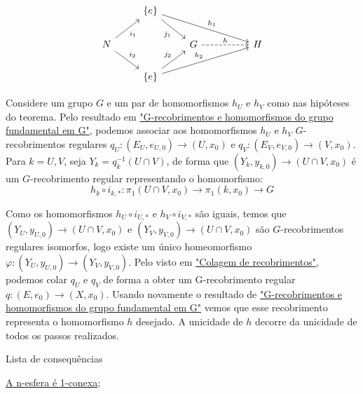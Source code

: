 \[\begin{tikzcd}
	& {\{e\}} \\
	N && G && H \\
	& {\{e\}}
	\arrow["{j_1}"', from=1-2, to=2-3]
	\arrow["{h_1}", from=1-2, to=2-5]
	\arrow["{i_1}"', from=2-1, to=1-2]
	\arrow["{i_2}", from=2-1, to=3-2]
	\arrow["h", dashed, from=2-3, to=2-5]
	\arrow["{j_2}", from=3-2, to=2-3]
	\arrow["{h_2}", from=3-2, to=2-5]
\end{tikzcd}\]

\begin{dem}
    Considere um grupo $G$ e um par de homomorfismos $h_U$ e $h_V$ como nas hipóteses do teorema. Pelo resultado em \hyperref[homomorfismos-e-g-recobrimentos-prop]{"G-recobrimentos e homomorfismos do grupo fundamental em G"}, podemos associar aos homomorfismos $h_U$ e $h_V$ $G$-recobrimentos regulares $q_U:(E_U,e_{U, 0}) \longrightarrow (U, x_0)$ e $q_V:(E_V,e_{V, 0}) \longrightarrow (V, x_0)$. Para $k = U, V$, seja $Y_k = q_k^{-1}(U \cap V)$, de forma que $(Y_k, y_{k, 0}) \longrightarrow (U \cap V, x_0)$ é um $G$-recobrimento regular representando o homomorfismo: $$h_k \circ i_{k, *}:  \pi_1(U \cap V, x_0) \longrightarrow \pi_1(k, x_0) \longrightarrow G$$

    Como os homomorfismos $h_U \circ i_{U, *}$ e $h_V \circ i_{V, *}$ são iguais, temos que $(Y_U, y_{U, 0}) \longrightarrow (U \cap V, x_0)$ e $(Y_V, y_{V, 0}) \longrightarrow (U \cap V, x_0)$ são $G$-recobrimentos regulares isomorfos, logo existe um único homeomorfismo $\varphi: (Y_U, y_{U, 0}) \longrightarrow (Y_V, y_{V, 0})$. Pelo visto em \hyperref[colagem-de-recobrimentos-prop]{"Colagem de recobrimentos"}, podemos colar $q_U$ e $q_V$ de forma a obter um G-recobrimento regular $q:(E, e_0) \longrightarrow (X, x_0)$. Usando novamente o resultado de \hyperref[homomorfismos-e-g-recobrimentos-prop]{"G-recobrimentos e homomorfismos do grupo fundamental em G"} vemos que esse recobrimento representa o homomorfismo $h$ desejado. A unicidade de $h$ decorre da unicidade de todos os passos realizados.
\end{dem}

\begin{titlemize}{Lista de consequências}
	\item \hyperref[n-esfera-1-conexa-ex]{A n-esfera é 1-conexa};
\end{titlemize}
